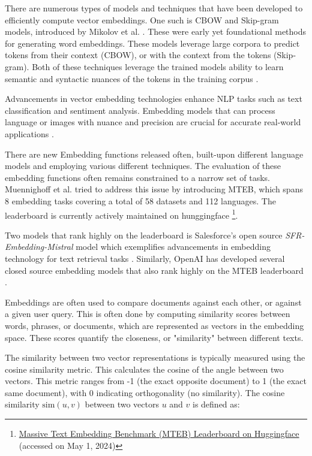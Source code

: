 


There are numerous types of models and techniques that have been developed to efficiently compute vector embeddings. One such is \gls{CBOW} and Skip-gram models, introduced by Mikolov et al. \cite{mikolov_efficient_2013-1}. These were early yet foundational methods for generating word embeddings. These models leverage large corpora to predict tokens from their context (CBOW), or with the context from the tokens (Skip-gram). Both of these techniques leverage the trained models ability to learn semantic and syntactic nuances of the tokens in the training corpus \cite{mikolov_efficient_2013-1, mikolov_distributed_2013}.


Advancements in vector embedding technologies enhance \gls{NLP} tasks such as text classification and sentiment analysis. Embedding models that can process language or images with nuance and precision are crucial for accurate real-world applications \cite{pennington_glove_2014}.


There are new Embedding functions released often, built-upon different language models and employing various different techniques. The evaluation of these embedding functions often remains constrained to a narrow set of tasks. Muennighoff et al. \cite{muennighoff_mteb_2023-1} tried to address this issue by introducing \gls{MTEB}, which spans 8 embedding tasks covering a total of 58 datasets and 112 languages. The leaderboard is currently actively maintained on hunggingface \footnote{\href{https://huggingface.co/spaces/mteb/leaderboard}{Massive Text Embedding Benchmark (MTEB) Leaderboard on Huggingface} (accessed on May 1, 2024)}.


Two models that rank highly on the leaderboard is Salesforce's open source \textit{SFR-Embedding-Mistral} model which exemplifies advancements in embedding technology for text retrieval tasks \cite{meng_sfr-embedding-mistral_2024}. Similarly, OpenAI has developed several closed source embedding models that also rank highly on the MTEB leaderboard \cite{openai_new_2022, openai_new_2024}.


Embeddings are often used to compare documents against each other, or against a given user query. This is often done by computing similarity scores between words, phrases, or documents, which are represented as vectors in the embedding space. These scores quantify the closeness, or "similarity" between different texts.


The similarity between two vector representations is typically measured using the cosine similarity metric. This calculates the cosine of the angle between two vectors. This metric ranges from -1 (the exact opposite document) to 1 (the exact same document), with 0 indicating orthogonality (no similarity). The cosine similarity \( \text{sim}(u, v) \) between two vectors \( u \) and \( v \) is defined as:


